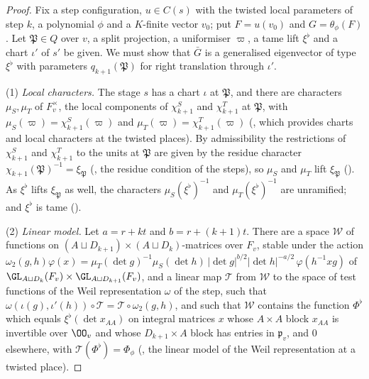 \begin{proof}
Fix a step configuration, $u\in C(s)$ with the twisted local parameters of step $k$, a polynomial $\phi$ and a $K$-finite vector $v_0$; put
$F=u(v_0)$ and $G=\theta_\phi(F)$. Let $\mathfrak P\in Q$ over $v$, a split projection, a uniformiser $\varpi$, a tame lift $\xi^\flat$ and a
chart $\iota'$ of $s'$ be given. We must show that $\bar G$ is a generalised eigenvector of type $\xi^\flat$ with parameters $q_{k+1}(\mathfrak P)$
for right translation through $\iota'$.

(1) \emph{Local characters.} The stage $s$ has a chart $\iota$ at $\mathfrak P$, and there are characters $\mu_S,\mu_T$ of $F_v^\times$, the local
components of $\chi^S_{k+1}$ and $\chi^T_{k+1}$ at $\mathfrak P$, with $\mu_S(\varpi)=\chi^S_{k+1}(\varpi)$ and $\mu_T(\varpi)=\chi^T_{k+1}(\varpi)$
(, which provides charts and local characters at the twisted places). By admissibility the
restrictions of $\chi^S_{k+1}$ and $\chi^T_{k+1}$ to the units at $\mathfrak P$ are given by the residue character
$\chi_{k+1}(\mathfrak P)^{-1}=\xi_{\mathfrak P}$ (, the residue condition of the steps), so $\mu_S$
and $\mu_T$ lift $\xi_{\mathfrak P}$ (). As $\xi^\flat$ lifts $\xi_{\mathfrak P}$ as
well, the characters $\mu_S(\xi^\flat)^{-1}$ and $\mu_T(\xi^\flat)^{-1}$ are unramified; and $\xi^\flat$ is tame
().

(2) \emph{Linear model.} Let $a=r+kt$ and $b=r+(k+1)t$. There are a space $\mathcal W$ of functions on $(A\sqcup D_{k+1})\times(A\sqcup
D_k)$-matrices over $F_v$, stable under the action
$\omega_2(g,h)\varphi(x)=\mu_T(\det g)^{-1}\mu_S(\det h)\,|\det g|^{b/2}|\det h|^{-a/2}\,\varphi(h^{-1}xg)$ of
$\GL_{A\sqcup D_k}(F_v)\times\GL_{A\sqcup D_{k+1}}(F_v)$,
and a linear map $\mathcal T$ from $\mathcal W$ to the space of test functions of the Weil representation $\omega$ of the step, such that
$\omega(\iota(g),\iota'(h))\circ\mathcal T=\mathcal T\circ\omega_2(g,h)$, and such that $\mathcal W$ contains the function $\Phi^\flat$ which equals
$\xi^\flat(\det x_{AA})$ on integral matrices $x$ whose $A\times A$ block $x_{AA}$ is invertible over $\OO_v$ and whose $D_{k+1}\times A$ block has
entries in $\mathfrak p_v$, and $0$ elsewhere, with $\mathcal T(\Phi^\flat)=\Phi_\phi$ (,
the linear model of the Weil representation at a twisted place).


\end{proof}
